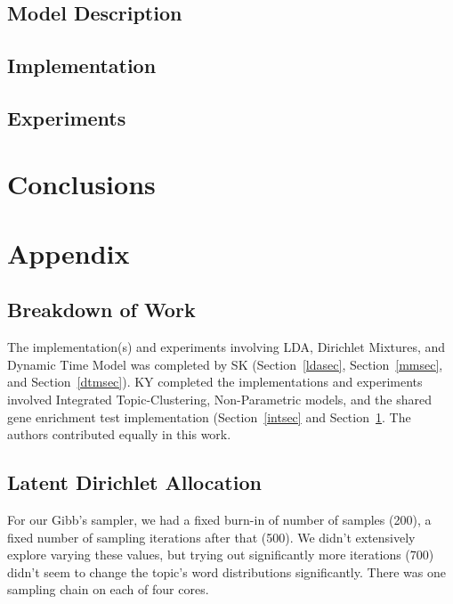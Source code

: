 \documentclass{article}
\begin{document}
\subsection{Model Description} 
\subsection{Implementation} 
\subsection{Experiments} 

\section{Conclusions} 
\label{nonparametricsec}






\section{Appendix} 

\subsection{Breakdown of Work}
The implementation(s) and experiments involving LDA, Dirichlet Mixtures, and Dynamic Time Model was completed by SK (Section~\ref{ldasec}, Section~\ref{mmsec}, and Section~\ref{dtmsec}). KY completed the implementations and experiments involved Integrated Topic-Clustering, Non-Parametric models, and the shared gene enrichment test implementation (Section~\ref{intsec} and Section~\ref{nonparametricsec}. The authors contributed equally in this work.

\subsection{Latent Dirichlet Allocation}
\label{ldaappendix}
For our Gibb's sampler, we had a fixed burn-in of number of samples (200), a fixed number of sampling iterations after that (500). We didn't extensively explore varying these values, but trying out significantly more iterations (700) didn't seem to change the topic's word distributions significantly. There was one sampling chain on each of four cores.
\end{document}
